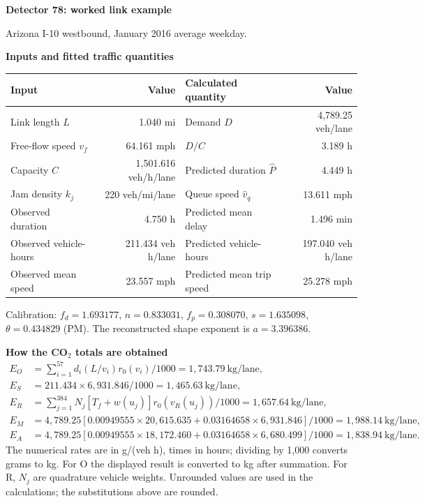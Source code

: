 
\newpage
\fontsize{10}{12}\selectfont
{\fontsize{19}{22}\selectfont\bfseries\color{navy}Detector 78: worked link example}\par
{\color{muted}Arizona I-10 westbound, January 2016 average weekday.}


\vspace{7pt}\textbf{Inputs and fitted traffic quantities}\par
\renewcommand{\arraystretch}{1.35}\setlength{\tabcolsep}{6pt}
\begin{tabular*}{\linewidth}{@{\extracolsep{\fill}}lrlr@{}}\toprule
Input & Value & Calculated quantity & Value\\\midrule
Link length $L$ & 1.040 mi & Demand $D$ & 4,789.25 veh/lane\\
Free-flow speed $v_f$ & 64.161 mph & $D/C$ & 3.189 h\\
Capacity $C$ & 1,501.616 veh/h/lane & Predicted duration $\widehat P$ & 4.449 h\\
Jam density $k_j$ & 220 veh/mi/lane & Queue speed $\widehat v_q$ & 13.611 mph\\
Observed duration & 4.750 h & Predicted mean delay & 1.496 min\\
Observed vehicle-hours & 211.434 veh h/lane & Predicted vehicle-hours & 197.040 veh h/lane\\
Observed mean speed & 23.557 mph & Predicted mean trip speed & 25.278 mph\\\bottomrule
\end{tabular*}
\par\smallskip
{\small Calibration: $f_d=1.693177$, $n=0.833031$, $f_p=0.308070$, $s=1.635098$, $\theta=0.434829$ (PM).
The reconstructed shape exponent is $a=3.396386$.}

\vspace{9pt}\textbf{How the CO$_2$ totals are obtained}
\begin{align*}
E_O &= \sum_{i=1}^{57}d_i(L/v_i)r_0(v_i)/1000 = 1,743.79\ \text{kg/lane},\\
E_S &= 211.434\times 6,931.846 /1000 = 1,465.63\ \text{kg/lane},\\
E_R &= \sum_{j=1}^{384}N_j[T_f+w(u_j)]r_0(v_R(u_j))/1000
      = 1,657.64\ \text{kg/lane},\\
E_M &= 4,789.25[0.00949555\times 20,615.635+0.03164658\times 6,931.846]/1000
      = 1,988.14\ \text{kg/lane},\\
E_A &= 4,789.25[0.00949555\times 18,172.460+0.03164658\times 6,680.499]/1000
      = 1,838.94\ \text{kg/lane}.
\end{align*}
The numerical rates are in g/(veh h), times in hours; dividing by 1,000 converts grams to kg.
For O the displayed result is converted to kg after summation. For R, $N_j$ are quadrature vehicle weights.
Unrounded values are used in the calculations; the substitutions above are rounded.

